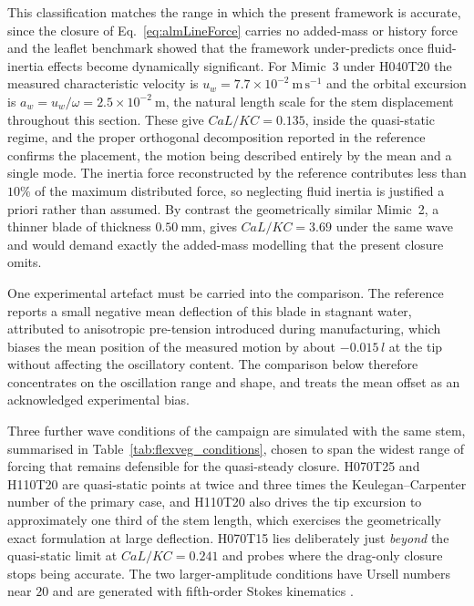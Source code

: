 \noindent
This classification matches the range in which the present framework is accurate, since the closure of Eq.~\eqref{eq:almLineForce} carries no added-mass or history force and the leaflet benchmark showed that the framework under-predicts once fluid-inertia effects become dynamically significant. For Mimic~3 under H040T20 the measured characteristic velocity is $u_w = 7.7\times10^{-2}~\mathrm{m\,s^{-1}}$ and the orbital excursion is $a_w = u_w/\omega = 2.5\times10^{-2}~\mathrm{m}$, the natural length scale for the stem displacement throughout this section. These give $CaL/KC = 0.135$, inside the quasi-static regime, and the proper orthogonal decomposition reported in the reference confirms the placement, the motion being described entirely by the mean and a single mode. The inertia force reconstructed by the reference contributes less than $10\%$ of the maximum distributed force, so neglecting fluid inertia is justified a priori rather than assumed. By contrast the geometrically similar Mimic~2, a thinner blade of thickness $0.50~\mathrm{mm}$, gives $CaL/KC = 3.69$ under the same wave and would demand exactly the added-mass modelling that the present closure omits.

\noindent
One experimental artefact must be carried into the comparison. The reference reports a small negative mean deflection of this blade in stagnant water, attributed to anisotropic pre-tension introduced during manufacturing, which biases the mean position of the measured motion by about $-0.015\,l$ at the tip without affecting the oscillatory content. The comparison below therefore concentrates on the oscillation range and shape, and treats the mean offset as an acknowledged experimental bias.

\noindent
Three further wave conditions of the campaign are simulated with the same stem, summarised in Table~\ref{tab:flexveg_conditions}, chosen to span the widest range of forcing that remains defensible for the quasi-steady closure. H070T25 and H110T20 are quasi-static points at twice and three times the Keulegan--Carpenter number of the primary case, and H110T20 also drives the tip excursion to approximately one third of the stem length, which exercises the geometrically exact formulation at large deflection. H070T15 lies deliberately just \emph{beyond} the quasi-static limit at $CaL/KC = 0.241$ and probes where the drag-only closure stops being accurate. The two larger-amplitude conditions have Ursell numbers near $20$ and are generated with fifth-order Stokes kinematics \citep{fenton_fifth_1985}.

